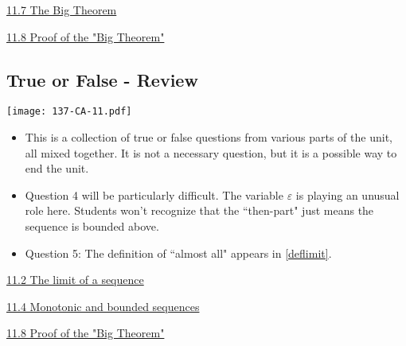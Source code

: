 \documentclass[11pt]{article}
\newcommand{\e}{\varepsilon}
\newcommand{\nl}{\hfill \vspace{-1.1\baselineskip}} %
\newcommand{\vii}{\hspace{8mm} \href{https://www.youtube.com/watch?v=Dr8LzBA-H84&list=PLlwePzQY_wW_yFyXauToZNFNhhufzioP2&index=2}{11.2 The limit of a sequence}}
\newcommand{\viv}{\hspace{8mm} \href{https://www.youtube.com/watch?v=J8uZJ9by0ys&list=PLlwePzQY_wW_yFyXauToZNFNhhufzioP2&index=4}{11.4 Monotonic and bounded sequences}}
\newcommand{\vvii}{\hspace{8mm} \href{https://www.youtube.com/watch?v=Dd3n2rfqxf4&list=PLlwePzQY_wW_yFyXauToZNFNhhufzioP2&index=7}{11.7 The Big Theorem}}
\newcommand{\vviii}{\hspace{8mm} \href{https://www.youtube.com/watch?v=aMZRptPCtZc&list=PLlwePzQY_wW_yFyXauToZNFNhhufzioP2&index=8}{11.8 Proof of the "Big Theorem"}}
\begin{document}
\begin{videos}
\vvii

\vviii
\end{videos}

\newpage
\subsection{True or False - Review}

\begin{center}
{ \texttt{[image: 137-CA-11.pdf]}} 
\end{center}

\begin{comments}
\nl
	\begin{itemize}
		\item  This is a collection of true or false questions from various parts of the unit, all mixed together.  It is not a necessary question, but it is a possible way to end the unit.
		\item Question 4 will be particularly difficult.  The variable $\e$ is playing an unusual role here.  Students won't recognize that the ``then-part" just means the sequence is bounded above.
		\item Question 5: The definition of ``almost all" appears in \autoref{deflimit}.
	\end{itemize}
\end{comments}

\begin{videos}
\vii

\viv

\vviii
\end{videos}

\newpage
\end{document}
